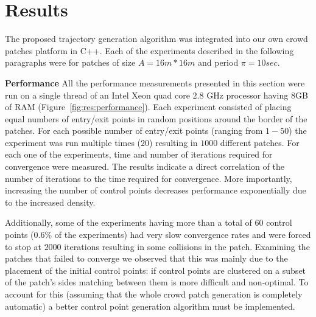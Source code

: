 \section{Results}
\label{sec:results}


The proposed trajectory generation algorithm was integrated into our own crowd patches platform in C++.
Each of the experiments described in the following paragraphs were for patches of size $A = 16m * 16m$ and period $\pi = 10sec$.

\textbf{Performance}
All the performance measurements presented in this section were run on a single thread of an Intel Xeon quad core $2.8$ GHz processor having $8$GB of RAM (Figure~\ref{fig:res:performance}).
Each experiment consisted of placing equal numbers of entry/exit points in random positions around the border of the patches.
For each possible number of entry/exit points (ranging from $1-50$) the experiment was run multiple times ($20$) resulting in $1000$ different patches.
For each one of the experiments, time and number of iterations required for convergence were measured.
The results indicate a direct correlation of the number of iterations to the time required for convergence.
More importantly, increasing the number of control points decreases performance exponentially due to the increased density.

Additionally, some of the experiments having more than a total of $60$ control points ($0.6\%$ of the experiments) had very slow convergence rates and were forced to stop at $2000$ iterations resulting in some collisions in the patch.
Examining the patches that failed to converge we observed that this was mainly due to the placement of the initial control points: if control points are clustered on a subset of the patch's sides matching between them is more difficult and non-optimal.
To account for this (assuming that the whole crowd patch generation is completely automatic) a better control point generation algorithm must be implemented.





